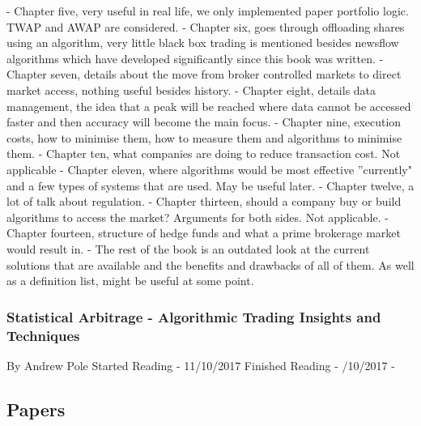 \documentclass[12pt,a4paper]{article}
\begin{document}
- Chapter five, very useful in real life, we only implemented paper portfolio logic. TWAP and AWAP are considered. \newline
- Chapter six, goes through offloading shares using an algorithm, very little black box trading is mentioned besides newsflow algorithms which have developed significantly since this book was written. \newline
- Chapter seven, details about the move from broker controlled markets to direct market access, nothing useful besides history. \newline
- Chapter eight, details data management, the idea that a peak will be reached where data cannot be accessed faster and then accuracy will become the main focus. \newline
- Chapter nine, execution costs, how to minimise them, how to measure them and algorithms to minimise them. \newline
- Chapter ten, what companies are doing to reduce transaction cost. Not applicable \newline
- Chapter eleven, where algorithms would be most effective ''currently" and a few types of systems that are used. May be useful later. \newline
- Chapter twelve, a lot of talk about regulation. \newline
- Chapter thirteen, should a company buy or build algorithms to access the market? Arguments for both sides. Not applicable. \newline
- Chapter fourteen, structure of hedge funds and what a prime brokerage market would result in. \newline
- The rest of the book is an outdated look at the current solutions that are available and the benefits and drawbacks of all of them. As well as a definition list, might be useful at some point.

\subsubsection*{Statistical Arbitrage - Algorithmic Trading Insights and Techniques}
By Andrew Pole \newline
Started Reading - 11/10/2017 \newline
Finished Reading -  /10/2017 \newline
\newline
-

\subsection*{Papers}
\end{document}
